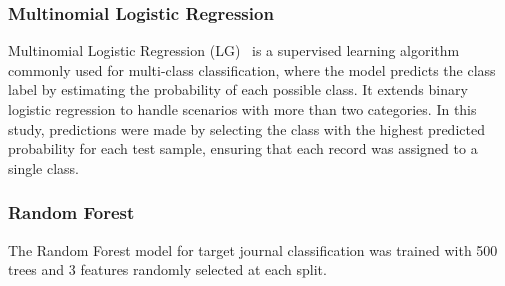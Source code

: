 \documentclass[9pt,twocolumn,twoside]{pnas-new}
\begin{document}
\subsubsection*{Multinomial Logistic Regression}

Multinomial Logistic Regression (LG)~\cite{doi:https://doi.org/10.1002/9781119450382.ch10} is a supervised learning algorithm commonly used for multi-class classification, where the model predicts the class label by estimating the probability of each possible class. It extends binary logistic regression to handle scenarios with more than two categories. In this study, predictions were made by selecting the class with the highest predicted probability for each test sample, ensuring that each record was assigned to a single class.

\subsubsection*{Random Forest}

The Random Forest model for target journal classification was trained with 500 trees and 3 features randomly selected at each split.
\end{document}
